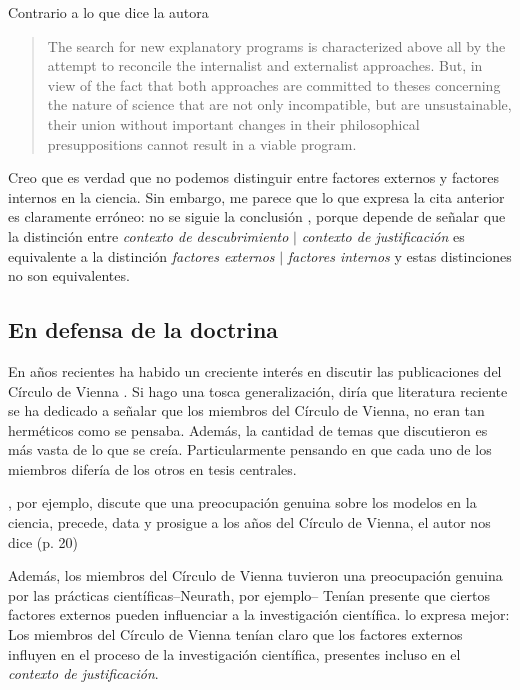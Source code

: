 Contrario a lo que dice la autora

\begin{quote}
	The search for new explanatory programs is characterized above all by the attempt to reconcile the internalist and externalist approaches. But, in view of the fact that both approaches are committed to theses concerning the nature of science that are not only incompatible, but are unsustainable, their union without important changes in their philosophical presuppositions cannot result in a viable program. \parencite[][p. 79]{Yturbe1995}
\end{quote}

Creo que es verdad que no podemos distinguir entre factores externos y factores internos en la ciencia.
Sin embargo, me parece que lo que expresa la cita anterior es claramente erróneo: no se siguie la conclusión , porque depende de señalar que la distinción entre  \emph{contexto de descubrimiento} $|$ \emph{contexto de justificación} es equivalente a la distinción \emph{factores externos} $|$ \emph{factores internos} y estas distinciones no son equivalentes.



\subsection{En defensa de la doctrina}

\noindent En años recientes ha habido un creciente interés en discutir las publicaciones del Círculo de Vienna \parencite{Bentley2023, Richardson2023, Suarez2024, Riel2014}.
Si hago una tosca generalización, diría que literatura reciente se ha dedicado a señalar que los miembros del Círculo de Vienna, no eran tan herméticos como se pensaba.
Además, la cantidad de temas que discutieron es más vasta de lo que se creía.
Particularmente pensando en que cada uno de los miembros difería de los otros en tesis centrales.

\textcite{Suarez2024}, por ejemplo, discute que una preocupación genuina sobre los modelos en la ciencia, precede, data y prosigue a los años del Círculo de Vienna, el autor nos dice  (p. 20)

Además, los miembros del Círculo de Vienna tuvieron una preocupación genuina por las prácticas científicas--Neurath, por ejemplo--
Tenían presente que ciertos factores externos pueden influenciar a la investigación científica.
\textcite[][p. 24]{Bentley2023} lo expresa mejor: 
Los miembros del Círculo de Vienna tenían claro que los factores externos influyen en el proceso de la investigación científica, presentes incluso en el \emph{contexto de justificación}.

